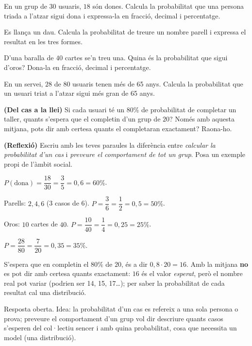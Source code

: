 \begin{exercicis}
\begin{exlist}
  \item En un grup de $30$ usuaris, $18$ són dones. Calcula la probabilitat que una
        persona triada a l'atzar sigui dona i expressa-la en fracció, decimal i
        percentatge.
  \item Es llança un dau. Calcula la probabilitat de treure un nombre parell i expressa
        el resultat en les tres formes.
  \item D'una baralla de $40$ cartes se'n treu una. Quina és la probabilitat que sigui
        d'oros? Dona-la en fracció, decimal i percentatge.
  \item En un servei, $28$ de $80$ usuaris tenen més de 65 anys. Calcula la probabilitat
        que un usuari triat a l'atzar sigui més gran de 65 anys.
  \item \textbf{(Del cas a la llei)} Si cada usuari té un $80\%$ de probabilitat de
        completar un taller, quants s'espera que el completin d'un grup de $20$? Només
        amb aquesta mitjana, pots dir amb certesa quants el completaran exactament?
        Raona-ho.
  \item \textbf{(Reflexió)} Escriu amb les teves paraules la diferència entre
        \emph{calcular la probabilitat d'un cas} i \emph{preveure el comportament de tot
        un grup}. Posa un exemple propi de l'àmbit social.
\end{exlist}
\end{exercicis}

\begin{solucions}
\begin{sollist}
  \item $P(\text{dona})=\dfrac{18}{30}=\dfrac{3}{5}=0,6=60\%$.
  \item Parells: $2,4,6$ (3 casos de 6). $P=\dfrac{3}{6}=\dfrac{1}{2}=0,5=50\%$.
  \item Oros: $10$ cartes de $40$. $P=\dfrac{10}{40}=\dfrac{1}{4}=0,25=25\%$.
  \item $P=\dfrac{28}{80}=\dfrac{7}{20}=0,35=35\%$.
  \item S'espera que en completin el $80\%$ de $20$, és a dir $0,8\cdot 20=16$. Amb la
        mitjana \textbf{no} es pot dir amb certesa quants exactament: $16$ és el valor
        \emph{esperat}, però el nombre real pot variar (podrien ser 14, 15, 17\ldots);
        per saber la probabilitat de cada resultat cal una distribució.
  \item Resposta oberta. Idea: la probabilitat d'un cas es refereix a una sola persona o
        prova; preveure el comportament d'un grup vol dir descriure quants casos
        s'esperen del col·lectiu sencer i amb quina probabilitat, cosa que necessita un
        model (una distribució).
\end{sollist}
\end{solucions}

